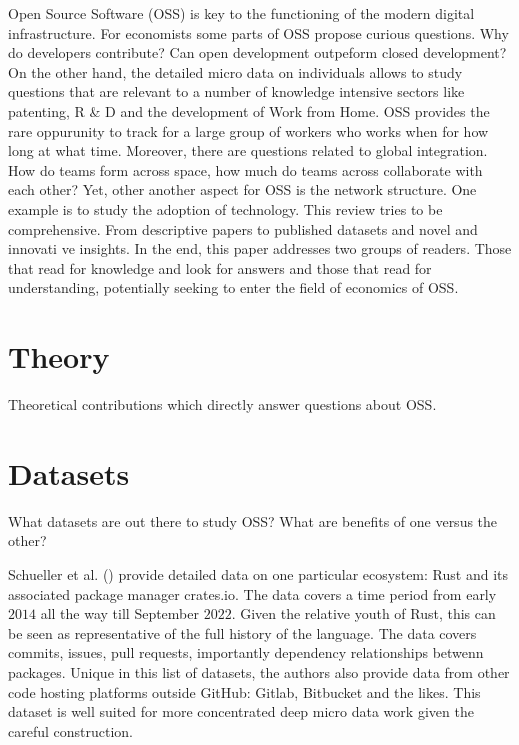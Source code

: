 \documentclass[
  12pt,
]{article}
\begin{document}
Open Source Software (OSS) is key to the functioning of the modern
digital infrastructure. For economists some parts of OSS propose curious
questions. Why do developers contribute? Can open development outpeform
closed development? On the other hand, the detailed micro data on
individuals allows to study questions that are relevant to a number of
knowledge intensive sectors like patenting, R \& D and the development
of Work from Home. OSS provides the rare oppurunity to track for a large
group of workers who works when for how long at what time. Moreover,
there are questions related to global integration. How do teams form
across space, how much do teams across collaborate with each other? Yet,
other another aspect for OSS is the network structure. One example is to
study the adoption of technology. This review tries to be comprehensive.
From descriptive papers to published datasets and novel and innovati ve
insights. In the end, this paper addresses two groups of readers. Those
that read for knowledge and look for answers and those that read for
understanding, potentially seeking to enter the field of economics of
OSS.

\section{Theory}\label{sec-theory}

Theoretical contributions which directly answer questions about OSS.

\section{Datasets}\label{sec-datasets}

What datasets are out there to study OSS? What are benefits of one
versus the other?

Schueller et al. () provide detailed
data on one particular ecosystem: Rust and its associated package
manager crates.io. The data covers a time period from early \(2014\) all
the way till September \(2022\). Given the relative youth of Rust, this
can be seen as representative of the full history of the language. The
data covers commits, issues, pull requests, importantly dependency
relationships betwenn packages. Unique in this list of datasets, the
authors also provide data from other code hosting platforms outside
GitHub: Gitlab, Bitbucket and the likes. This dataset is well suited for
more concentrated deep micro data work given the careful construction.
\end{document}
